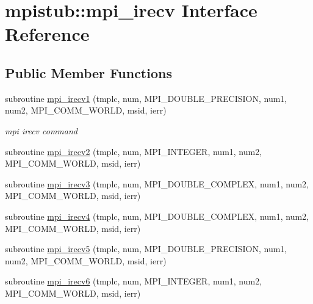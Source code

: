 \hypertarget{interfacempistub_1_1mpi__irecv}{}\section{mpistub\+::mpi\+\_\+irecv Interface Reference}
\label{interfacempistub_1_1mpi__irecv}
\subsection*{Public Member Functions}
\begin{DoxyCompactItemize}
\item 
subroutine \mbox{\hyperlink{interfacempistub_1_1mpi__irecv_aabcc66e35e1bbe27613d8e70471d0aab}{mpi\+\_\+irecv1}} (tmplc, num, M\+P\+I\+\_\+\+D\+O\+U\+B\+L\+E\+\_\+\+P\+R\+E\+C\+I\+S\+I\+ON, num1, num2, M\+P\+I\+\_\+\+C\+O\+M\+M\+\_\+\+W\+O\+R\+LD, msid, ierr)
\begin{DoxyCompactList}\small\item\em mpi irecv command \end{DoxyCompactList}\item 
subroutine \mbox{\hyperlink{interfacempistub_1_1mpi__irecv_a177554c6bb9e41e16d6e89339a73f6dd}{mpi\+\_\+irecv2}} (tmplc, num, M\+P\+I\+\_\+\+I\+N\+T\+E\+G\+ER, num1, num2, M\+P\+I\+\_\+\+C\+O\+M\+M\+\_\+\+W\+O\+R\+LD, msid, ierr)
\item 
subroutine \mbox{\hyperlink{interfacempistub_1_1mpi__irecv_ac5c143155b2e07bab6a2730ab9d6000f}{mpi\+\_\+irecv3}} (tmplc, num, M\+P\+I\+\_\+\+D\+O\+U\+B\+L\+E\+\_\+\+C\+O\+M\+P\+L\+EX, num1, num2, M\+P\+I\+\_\+\+C\+O\+M\+M\+\_\+\+W\+O\+R\+LD, msid, ierr)
\item 
subroutine \mbox{\hyperlink{interfacempistub_1_1mpi__irecv_aae5cbd57d43bfa9d301bcbf7b90f8973}{mpi\+\_\+irecv4}} (tmplc, num, M\+P\+I\+\_\+\+D\+O\+U\+B\+L\+E\+\_\+\+C\+O\+M\+P\+L\+EX, num1, num2, M\+P\+I\+\_\+\+C\+O\+M\+M\+\_\+\+W\+O\+R\+LD, msid, ierr)
\item 
subroutine \mbox{\hyperlink{interfacempistub_1_1mpi__irecv_aaf483c234206c1e29ee73f8112be8c02}{mpi\+\_\+irecv5}} (tmplc, num, M\+P\+I\+\_\+\+D\+O\+U\+B\+L\+E\+\_\+\+P\+R\+E\+C\+I\+S\+I\+ON, num1, num2, M\+P\+I\+\_\+\+C\+O\+M\+M\+\_\+\+W\+O\+R\+LD, msid, ierr)
\item 
subroutine \mbox{\hyperlink{interfacempistub_1_1mpi__irecv_a275d9c269d4c86a48a5cbeb5f5a56fbf}{mpi\+\_\+irecv6}} (tmplc, num, M\+P\+I\+\_\+\+I\+N\+T\+E\+G\+ER, num1, num2, M\+P\+I\+\_\+\+C\+O\+M\+M\+\_\+\+W\+O\+R\+LD, msid, ierr)
\end{DoxyCompactItemize}


